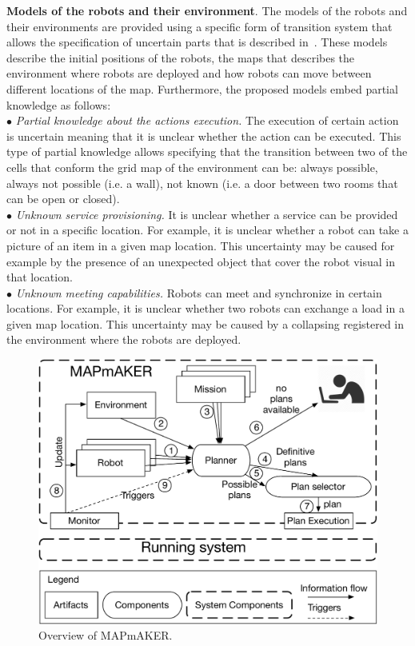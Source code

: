 \textbf{Models of the robots and their environment}. 
The models of the robots and their environments are provided using a specific form of transition system that allows the specification of uncertain parts that is described  in~\cite{mapmaker17}.
These models describe the initial positions of the robots, the maps that describes the environment where robots are deployed and how robots can move between different locations of the map. 
Furthermore, the proposed models embed partial knowledge as follows:\\
$\bullet$  \emph{Partial knowledge about the actions execution.} 
The execution of certain action is uncertain meaning that it is unclear whether the action can be executed.
This type of partial knowledge allows specifying that the transition between two of the cells that conform the grid map of the environment can be:
always possible, always not possible (i.e. a wall), not known (i.e. a door between two rooms that can be open or closed).\\
$\bullet$ \emph{Unknown service provisioning.} 
It is unclear  whether a service can be provided or not in a specific location. 
For example, it is unclear whether a robot can take a picture of an item in a given map location.
This  uncertainty may be caused for example by the presence of an unexpected object that cover the robot visual in that location.\\
$\bullet$ \emph{Unknown meeting capabilities.} Robots can meet and synchronize in certain locations.
For example, it is unclear whether two robots can exchange a load in a given map location.
This uncertainty may be caused by a collapsing registered in the environment where the robots are deployed.


\begin{figure}[t]
\begin{center}
\includegraphics[width=1\linewidth]{Figures/MAPmAKER.pdf}
\caption{Overview of  MAPmAKER.}
\label{fig:overview}
\end{center}
\end{figure}




